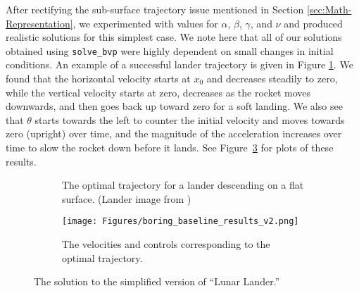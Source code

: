 \documentclass{article}
\begin{document}
After rectifying the sub-surface trajectory issue mentioned in Section \ref{sec:Math-Representation}, we experimented with values for $\alpha$, $\beta$, $\gamma$, and $\nu$ and produced realistic solutions for this simplest case. We note here that all of our solutions obtained using \texttt{solve\_bvp} were highly dependent on small changes in initial conditions. An example of a successful lander trajectory is given in Figure \ref{fig:trajectory}. We found that the horizontal velocity starts at $x_0$ and decreases steadily to zero, while the vertical velocity starts at zero, decreases as the rocket moves downwards, and then goes back up toward zero for a soft landing. We also see that $\theta$ starts towards the left to counter the initial velocity and  moves towards zero (upright) over time, and the magnitude of the acceleration increases over time to slow the rocket down before it lands. See Figure~\ref{fig:controls} for plots of these results.

\begin{figure}[h]
    \centering
    \begin{subfigure}{0.45\textwidth}
        \centering
        \caption{The optimal trajectory for a lander descending on a flat surface. (Lander image from \cite{reddit_media_2025})}
        \label{fig:trajectory}
    \end{subfigure}
    \hfill
    \begin{subfigure}{0.45\textwidth}
        \centering
        \texttt{[image: Figures/boring\_baseline\_results\_v2.png]}
        \caption{The velocities and controls corresponding to the optimal trajectory.}
        \label{fig:controls}
    \end{subfigure}
    \caption{The solution to the simplified version of ``Lunar Lander.''}

\end{figure}
\end{document}
